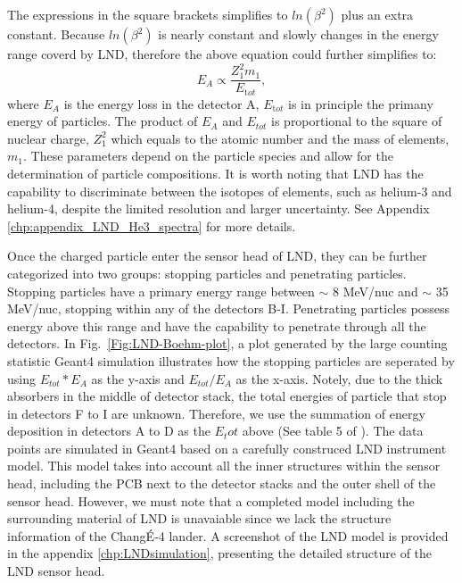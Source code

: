 The expressions in the square brackets simplifies to $ln(\beta^2)$ plus an extra constant. Because $ln(\beta^2)$ is nearly constant and slowly changes in the energy range coverd by \ac{LND}, therefore the above equation could further simplifies to:
\begin{equation}
    E_A \propto \frac{Z_1^2 m_1}{E_{\mathrm tot}},
    \label{eq:BB2}
\end{equation}
where $E_A$ is the energy loss in the detector A, $E_{\mathrm tot}$ is in principle the primany energy of particles.
The product of $E_A$ and $E_{tot}$ is proportional to the square of nuclear charge, $Z_1^2$ which equals to the atomic number and the mass of elements, $m_1$. These parameters depend on the particle species and allow for the determination of particle compositions. It is worth noting that \ac{LND} has the capability to discriminate between the isotopes of elements, such as helium-3 and helium-4, despite the limited resolution and larger uncertainty. See Appendix \ref{chp:appendix_LND_He3_spectra} for more details.



Once the charged particle enter the sensor head of \ac{LND}, they can be further categorized into two groups: stopping particles and penetrating particles. Stopping particles have a primary energy range between $\sim$ 8 MeV/nuc and $\sim$ 35 MeV/nuc, stopping within any of the detectors B-I. Penetrating particles possess energy above this range and have the capability to penetrate through all the detectors. In Fig.~\ref{Fig:LND-Boehm-plot}, a plot generated by the large counting statistic \ac{Geant4} \citep{Agostinelli-2003} simulation illustrates how the stopping particles are seperated by using $E_{tot} * E_A$ as the y-axis and $E_{tot} / E_A$ as the x-axis. 
Notely, due to the thick absorbers in the middle of detector stack, the total energies of particle that stop in detectors F to I are unknown. Therefore, we use the summation of energy deposition in detectors A to D as the $E_tot$ above (See table 5 of \citet{Wimmer2020SSRv}).
The data points are simulated in \ac{Geant4} based on a carefully construced \ac{LND} instrument model. This model takes into account all the inner structures within the sensor head, including the \ac{PCB} next to the detector stacks and the outer shell of the sensor head. However, we must note that a completed model including the surrounding material of \ac{LND} is unavaiable since we lack the structure information of the Chang\'E-4 lander.
A screenshot of the \ac{LND} model is provided in the appendix \ref{chp:LNDsimulation}, presenting the detailed structure of the \ac{LND} sensor head.

